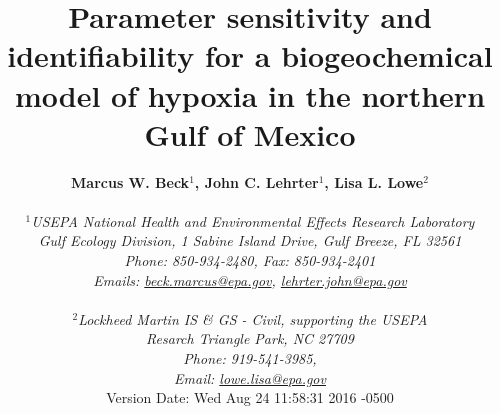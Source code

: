 \documentclass[letterpaper,12pt,oneside]{article}\usepackage[]{graphicx}\usepackage[]{color}
\begin{document}
\raggedbottom
\linenumbers
\raggedright
{}
\setlength{\parindent}{0.5in}
\renewcommand\refname{References \vspace{12pt}}

\begin{singlespace}
\title{{\bf {\Large Parameter sensitivity and identifiability for a biogeochemical model of hypoxia in the northern {G}ulf of {M}exico}}}
\author{
  {\bf {\normalsize Marcus W. Beck$^1$, John C. Lehrter$^1$, Lisa L. Lowe$^2$}}
  \\\\{\textit {\normalsize $^1$USEPA National Health and Environmental Effects Research Laboratory}}
  \\{\textit {\normalsize Gulf Ecology Division, 1 Sabine Island Drive, Gulf Breeze, FL 32561}}
	\\{\textit {\normalsize Phone: 850-934-2480, Fax: 850-934-2401}}
	\\{\textit {\normalsize Emails: \href{mailto:beck.marcus@epa.gov}{beck.marcus@epa.gov}, \href{mailto:lehrter.john@epa.gov}{lehrter.john@epa.gov}}}
	\\\\{\textit {\normalsize $^2$Lockheed Martin IS \& GS - Civil, supporting the USEPA}}
	\\{\textit {\normalsize Resarch Triangle Park, NC 27709}}
	\\{\textit {\normalsize Phone: 919-541-3985,}}
	\\{\textit {\normalsize Email: \href{mailto:lowe.lisa@epa.gov}{lowe.lisa@epa.gov}}}
  \vspace{1in} 
  \\ Version Date:   Wed Aug 24 11:58:31 2016 -0500
	}
\date{}
\maketitle
\end{singlespace}
\clearpage
\end{document}
